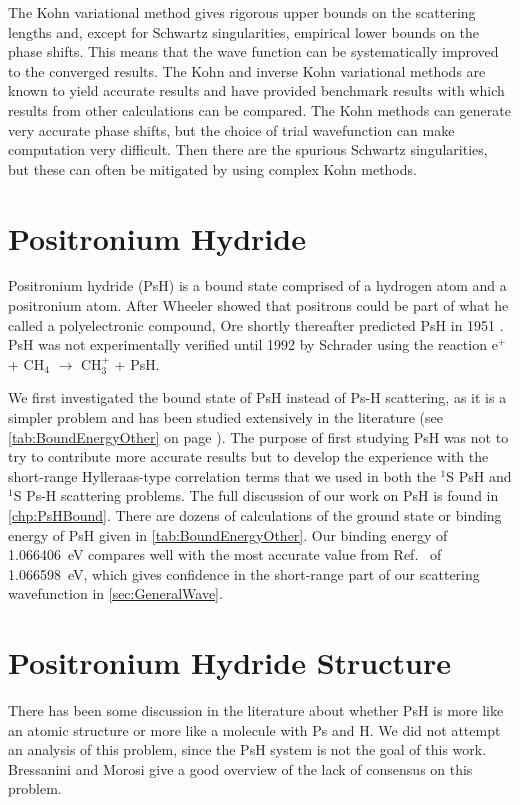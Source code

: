 \documentclass[Dissertation.tex]{subfiles}
\begin{document}
The Kohn variational method gives rigorous upper bounds on the scattering 
lengths and, except for Schwartz singularities, empirical lower bounds on the 
phase shifts. This means that the wave function can be systematically 
improved to the converged results. The Kohn and inverse Kohn variational 
methods are known to yield accurate results and have provided benchmark 
results \cite{VanReeth2003,VanReeth2004} with which results from other 
calculations can be compared. The Kohn methods can generate very accurate 
phase shifts, but the choice of trial wavefunction can make computation very 
difficult. Then there are the spurious Schwartz singularities, but these can 
often be mitigated by using complex Kohn methods.


\section{Positronium Hydride}
\label{sec:PsH}
Positronium hydride (PsH) is a bound state comprised of 
a hydrogen atom and a positronium atom. After Wheeler \cite{Wheeler1946} 
showed that positrons could be part of what he called a polyelectronic 
compound, Ore shortly thereafter predicted PsH in 1951 \cite{Ore1951}. PsH 
was not experimentally verified until 1992 by Schrader \cite{Schrader1992}
using the reaction e$^+$ + CH$_4$ $\to$ CH$_3^+$ + PsH.

We first investigated the bound state of PsH instead of Ps-H scattering, as 
it is a simpler problem and has been studied extensively in the literature
(see \cref{tab:BoundEnergyOther} on page \pageref{tab:BoundEnergyOther}).
The purpose of first studying PsH was not to try to contribute more accurate
results but to develop the experience with the short-range Hylleraas-type 
correlation terms that we used in both the $^1$S PsH and $^1$S Ps-H
scattering problems. 
The full discussion of our work on PsH is found in \cref{chp:PsHBound}.
There are dozens of calculations of the ground state
or binding energy of PsH given in \cref{tab:BoundEnergyOther}.
Our binding energy of \SI{1.066 406}{eV} compares well with the most accurate
value from Ref.~\cite{Bubin2006} of \SI{1.066 598}{eV}, which gives confidence
in the short-range part of our scattering wavefunction in
\cref{sec:GeneralWave}.



\section{Positronium Hydride Structure}
\label{sec:PsHStructure}
There has been some discussion in the literature about whether PsH is more 
like an atomic structure or more like a molecule with Ps and H. We did not 
attempt an analysis of this problem, since the PsH system is not the goal of 
this work. Bressanini and Morosi \cite{Bressanini2003} give a good overview 
of the lack of consensus on this problem. 
\end{document}
